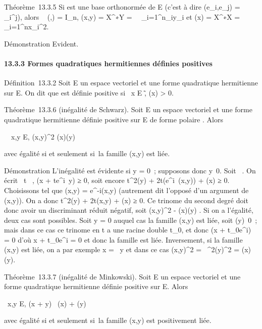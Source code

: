\documentclass[]{article}
\begin{document}
Théorème~13.3.5 Si  est une base orthonormée de E (c'est à dire
\phi(e_i,e_j) = \delta_i^j), alors
\mathrmMat~ (\phi,) =
I_n, \phi(x,y) = X^∗Y =\
\sum ~
_i=1^n\overlinex_iy_i
et \Phi(x) = X^∗X =\
\sum ~
_i=1^nx_i^2.

Démonstration Evident.

\paragraph{13.3.3 Formes quadratiques hermitiennes définies positives}

Définition~13.3.2 Soit E un \mathbb{C} espace vectoriel et \Phi une forme
quadratique hermitienne sur E. On dit que \Phi est définie positive si
\forall~x \in E \diagdown\0\~,
\Phi(x) > 0.

Théorème~13.3.6 (inégalité de Schwarz). Soit E un  espace vectoriel et
\Phi une forme quadratique hermitienne définie positive sur E de forme
polaire \phi. Alors

\forall~~x,y \in E,
\phi(x,y)^2 \leq \Phi(x)\Phi(y)

avec égalité si et seulement si~la famille (x,y) est liée.

Démonstration L'inégalité est évidente si y = 0~; supposons donc
y\neq~0. Soit \theta \in {}~. On écrit
\forall~t \in \mathbb{R}~, \Phi(x + te^i\theta~y) ≥ 0, soit
encore t^2\Phi(y) +
2t\mathrmRe(e^i\theta~\phi(x,y))
+ \Phi(x) ≥ 0. Choisissons \theta tel que \phi(x,y) =
e^-i\theta\phi(x,y) (autrement dit l'opposé d'un
argument de \phi(x,y)). On a donc t^2\Phi(y) +
2t\phi(x,y) + \Phi(x) ≥ 0. Ce trinome du second degré doit
donc avoir un discriminant réduit négatif, soit
\phi(x,y)^2 - \Phi(x)\Phi(y) \leq 0. Si on a
l'égalité, deux cas sont possibles. Soit y = 0 auquel cas la famille
(x,y) est liée, soit \Phi(y)\neq~0~; mais dans ce
cas ce trinome en t a une racine double t_0, et donc \Phi(x +
t_0e^i\thetay) = 0 d'où x + t_0e^i\thetay
= 0 et donc la famille est liée. Inversement, si la famille (x,y) est
liée, on a par exemple x = \lambda~y et dans ce cas
\phi(x,y)^2 =
\lambda~^2\Phi(y)^2 = \Phi(x)\Phi(y).

Théorème~13.3.7 (inégalité de Minkowski). Soit E un  espace vectoriel
et \Phi une forme quadratique hermitienne définie positive sur E. Alors

\forall~x,y \in E, \sqrt\Phi(x + y)~
\leq\sqrt\Phi(x) + \sqrt\Phi(y)

avec égalité si et seulement si~la famille (x,y) est positivement liée.
\end{document}
